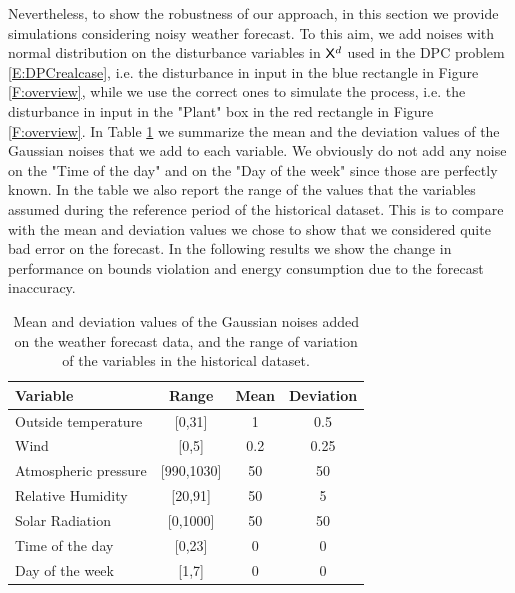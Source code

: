 \textcolor[rgb]{0,0,1}{Nevertheless, to show the robustness of our approach, in this section we provide simulations considering noisy weather forecast.
To this aim, we add noises with normal distribution on the disturbance variables in $\mathsf{X}^d$ used in the DPC problem \eqref{E:DPCrealcase}, i.e. the disturbance in input in the blue rectangle in Figure \ref{F:overview}, while we use the correct ones to simulate the process, i.e. the disturbance in input in the "Plant" box in the red rectangle in Figure \ref{F:overview}.
In Table \ref{T:NoiseParameters} we summarize the mean and the deviation values of the Gaussian noises that we add to each variable.
We obviously do not add any noise on the "Time of the day" and on the "Day of the week" since those are perfectly known.
In the table we also report the range of the values that the variables assumed during the reference period of the historical dataset.
This is to compare with the mean and deviation values we chose to show that we considered quite bad error on the forecast.
In the following results we show the change in performance on bounds violation and energy consumption due to the forecast inaccuracy.}
\begin{table}[t!]
	\centering	
	\textcolor[rgb]{0,0,1}{\begin{tabular}{lccc}
		\toprule
		Variable               & Range      & Mean & Deviation \\ 
		\midrule
		Outside temperature    & [0,31]     & 1	   & 0.5       \\
		Wind                   & [0,5] 		& 0.2  & 0.25      \\
		Atmospheric pressure   & [990,1030] & 50   & 50        \\
		Relative Humidity      & [20,91]	& 50   & 5         \\
		Solar Radiation        & [0,1000]   & 50   & 50        \\
		Time of the day        & [0,23]     & 0    & 0         \\
		Day of the week        & [1,7]      & 0    & 0         \\
		\bottomrule
	\end{tabular}}
	\caption{\textcolor[rgb]{0,0,1}{Mean and deviation values of the Gaussian noises added on the weather forecast data, and the range of variation of the variables in the historical dataset.}}
	\captionsetup{justification=centering}
	\label{T:NoiseParameters}
\end{table}

